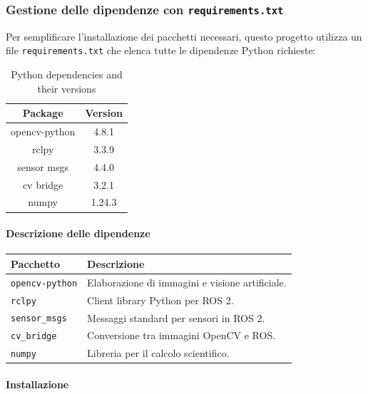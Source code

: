 \documentclass[11pt]{report}
\begin{document}
\subsubsection{Gestione delle dipendenze con \texttt{requirements.txt}}

Per semplificare l'installazione dei pacchetti necessari, questo progetto utilizza un file \texttt{requirements.txt} che elenca tutte le dipendenze Python richieste:

\begin{table}[h!]
\centering
\begin{tabular}{|c|c|}
\hline
\textbf{Package} & \textbf{Version} \\
\hline
opencv-python & 4.8.1 \\
rclpy & 3.3.9 \\
sensor msgs & 4.4.0 \\
cv bridge & 3.2.1 \\
numpy & 1.24.3 \\
\hline
\end{tabular}
\caption{Python dependencies and their versions}
\end{table}


\paragraph{Descrizione delle dipendenze}

\begin{center}
\begin{tabular}{@{}ll@{}}
\toprule
\textbf{Pacchetto}      & \textbf{Descrizione} \\
\midrule
\texttt{opencv-python}  & Elaborazione di immagini e visione artificiale. \\
\texttt{rclpy}          & Client library Python per ROS 2. \\
\texttt{sensor\_msgs}   & Messaggi standard per sensori in ROS 2. \\
\texttt{cv\_bridge}     & Conversione tra immagini OpenCV e ROS. \\
\texttt{numpy}          & Libreria per il calcolo scientifico. \\

\end{tabular}
\end{center}

\paragraph{Installazione}
\end{document}
